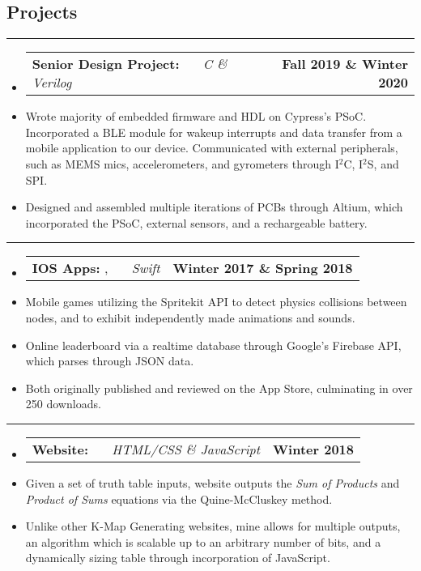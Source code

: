 \documentclass[10pt,letterpaper]{article}
\makeatletter
\newcommand{\items}[2]
{
	\begin{tabular*}{\linewidth}{l @{\extracolsep{\fill}} r}
		#1 & #2 \\
	\end{tabular*}
}
\newcommand{\sectionbreak}
{
	\vspace{-1.2em}
	\rule{\textwidth}{1.7pt}
	\vspace{-1.7em}
}
\makeatother
\begin{document}
\vspace{-1.5em}

\subsection*{Projects}
\sectionbreak


\begin{itemize}
	\item[]
		\items 
		{
			\textbf{Senior Design Project: }
			\emph{\smash{Smart Dog Collar}} \ \ \ \footnotesize \emph{C \& Verilog}
		}
			{\textbf{Fall 2019 \& Winter 2020}}
		\item 
			Wrote majority of embedded firmware and HDL on Cypress's PSoC. Incorporated a BLE module for wakeup interrupts and data transfer from a mobile application to our device. Communicated with external peripherals, such as MEMS mics, accelerometers, and gyrometers through I$^{2}$C, I$^{2}$S, and SPI. 
		\item 
			Designed and assembled multiple iterations of PCBs through Altium, which incorporated the PSoC, external sensors, and a rechargeable battery.

\end{itemize}

\hrule

\begin{itemize}
	\item[]
		\items 
		{
			\textbf{IOS Apps: }
			\href{https://appadvice.com/app/round-bound/1369632746}{\emph{\underline{\smash{Round 'a Bound}}}}, 
			\href{https://appadvice.com/app/tic-tac-emoji/1346934986}{\emph{\underline{\smash{Tic-Tac Emoji}}}} \ \ \ \footnotesize  \emph{Swift}
		}
			{\textbf{Winter 2017 \& Spring 2018}}
		\item 
			Mobile games utilizing the Spritekit API to detect physics collisions between nodes, and to exhibit independently made animations and sounds.
		\item
			Online leaderboard via a realtime database through Google's Firebase API, which parses through JSON data. 
		\item
			Both originally published and reviewed on the App Store, culminating in over 250 downloads.
\end{itemize}

\hrule

\begin{itemize}
	\item[]
		\items
			{	
				\textbf{Website: }
				\href{https://aashpointo.github.io/KmapWebsite/}{\emph{\underline{\smash{aashpointo.github.io/KmapWebsite}}}} \ \ \ \footnotesize \emph{HTML/CSS \& JavaScript}
				}
				{\textbf{Winter 2018}}
		\item
			Given a set of truth table inputs, website outputs the \emph{Sum of Products} and \emph{Product of Sums} equations via the  Quine-McCluskey method. 
		\item 
			Unlike other K-Map Generating websites, mine allows for multiple outputs, an algorithm which is scalable up to an arbitrary number of bits, and a dynamically sizing table through incorporation of JavaScript.

\end{itemize}
\end{document}
